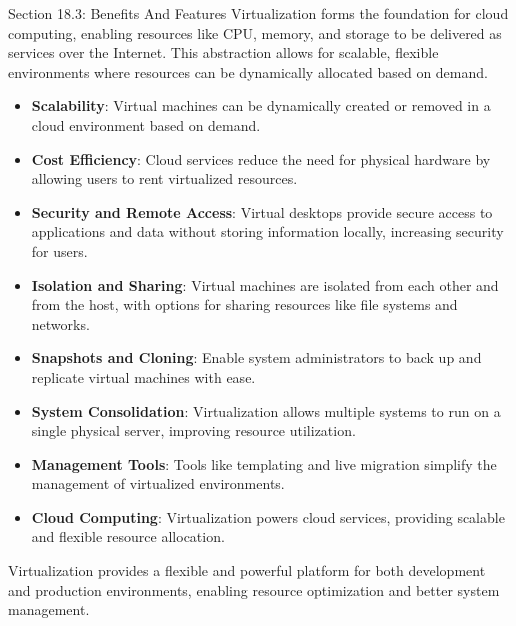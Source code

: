 \begin{notes}{Section 18.3: Benefits And Features}
    Virtualization forms the foundation for cloud computing, enabling resources like CPU, memory, and storage to be delivered as services over the Internet. This abstraction allows for scalable, flexible 
    environments where resources can be dynamically allocated based on demand.
    
    \begin{highlight}
    
        \begin{itemize}
            \item \textbf{Scalability}: Virtual machines can be dynamically created or removed in a cloud environment based on demand.
            \item \textbf{Cost Efficiency}: Cloud services reduce the need for physical hardware by allowing users to rent virtualized resources.
            \item \textbf{Security and Remote Access}: Virtual desktops provide secure access to applications and data without storing information locally, increasing security for users.
        \end{itemize}
    
    \end{highlight}
    
    \begin{highlight}
    
        \begin{itemize}
            \item \textbf{Isolation and Sharing}: Virtual machines are isolated from each other and from the host, with options for sharing resources like file systems and networks.
            \item \textbf{Snapshots and Cloning}: Enable system administrators to back up and replicate virtual machines with ease.
            \item \textbf{System Consolidation}: Virtualization allows multiple systems to run on a single physical server, improving resource utilization.
            \item \textbf{Management Tools}: Tools like templating and live migration simplify the management of virtualized environments.
            \item \textbf{Cloud Computing}: Virtualization powers cloud services, providing scalable and flexible resource allocation.
        \end{itemize}
    
    Virtualization provides a flexible and powerful platform for both development and production environments, enabling resource optimization and better system management.
    
    \end{highlight}
\end{notes}

